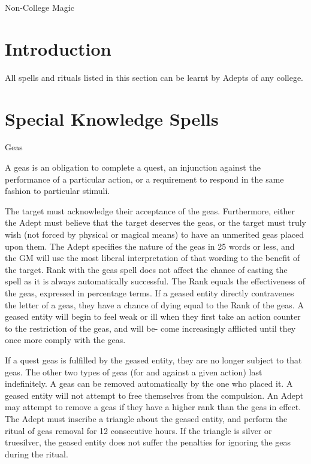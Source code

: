 \begin{Chapter}{Non-College Magic}

\section{Introduction}

All spells and rituals listed in this section can be learnt by Adepts
of any college.


\section{Special Knowledge Spells}

\begin{ritual}{Geas}

\begin{effects}
A geas is an obligation to complete a quest, an injunction against the
performance of a particular action, or a requirement to respond in the
same fashion to particular stimuli.

The target must acknowledge their acceptance of the geas.
Furthermore, either the Adept must believe that the target deserves
the geas, or the target must truly wish (not forced by physical or
magical means) to have an unmerited geas placed upon them. The Adept
specifies the nature of the geas in 25 words or less, and the GM will
use the most liberal interpretation of that wording to the benefit of
the target.  Rank with the geas spell does not affect the chance of
casting the spell as it is always automatically successful.  The Rank
equals the effectiveness of the geas, expressed in percentage terms.
If a geased entity directly contravenes the letter of a geas, they
have a chance of dying equal to the Rank of the geas. A geased entity
will begin to feel weak or ill when they first take an action counter
to the restriction of the geas, and will be- come increasingly
afflicted until they once more comply with the geas.

If a quest geas is fulfilled by the geased entity, they are no longer
subject to that geas.  The other two types of geas (for and against a
given action) last indefinitely.  A geas can be removed automatically
by the one who placed it. A geased entity will not attempt to free
themselves from the compulsion.  An Adept may attempt to remove a geas
if they have a higher rank than the geas in effect.  The Adept must
inscribe a triangle about the geased entity, and perform the ritual of
geas removal for 12 consecutive hours.  If the triangle is silver or
truesilver, the geased entity does not suffer the penalties for
ignoring the geas during the ritual.


\end{effects}
\end{ritual}
\end{Chapter}

